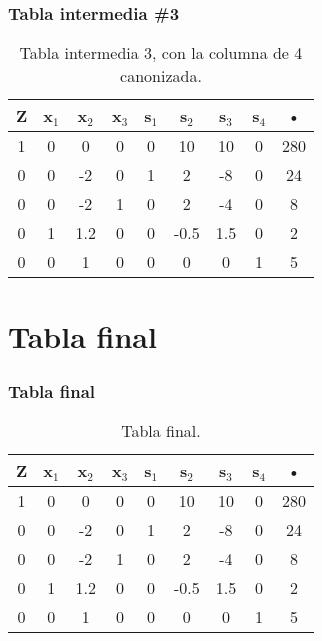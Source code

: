 \documentclass{beamer}
\begin{document}
 
\begin{frame}  
\frametitle{Tabla intermedia \#3} 
\begin{table}[H] 
\begin{center} 
\begin{tabular}{|*{9}{c|}} 
\hline 
\textbf{Z}  & \textbf{x$_{1}$} & \textbf{x$_{2}$} & \cellcolor{color_columna_candidata}\textcolor{color_blanco}{\textbf{x$_{3}$}} & \textbf{s$_{1}$} & \textbf{s$_{2}$} & \textbf{s$_{3}$} & \textbf{s$_{4}$} & \textbf{•} \\\hline \hline 
1 & 0 & 0 & \cellcolor{color_columna_candidata}\textcolor{color_blanco}{0} & 0 & 10 & 10 & 0 & 280 \\\hline 
0 & 0 & -2 & \cellcolor{color_columna_candidata}\textcolor{color_blanco}{0} & 1 & 2 & -8 & 0 & 24\\ 
\hline 
0 & 0 & -2 & \cellcolor{color_columna_candidata}\textcolor{color_blanco}{1} & 0 & 2 & -4 & 0 & 8\\ 
\hline 
0 & 1 & 1.2 & \cellcolor{color_columna_candidata}\textcolor{color_blanco}{0} & 0 & -0.5 & 1.5 & 0 & 2\\ 
\hline 
0 & 0 & 1 & \cellcolor{color_columna_candidata}\textcolor{color_blanco}{0} & 0 & 0 & 0 & 1 & 5\\ 
\hline 
\end{tabular} 
\caption{Tabla intermedia 3, con la columna de 4 canonizada.} 
\end{center} 
\end{table} 
\end{frame} 
 
\section{Tabla final} 
 
\begin{frame}  
\frametitle{Tabla final} 
\begin{table}[H] 
\begin{center} 
\begin{tabular}{|*{9}{c|}} 
\hline 
\textbf{Z}  & \textbf{x$_{1}$} & \textbf{x$_{2}$} & \textbf{x$_{3}$} & \textbf{s$_{1}$} & \textbf{s$_{2}$} & \textbf{s$_{3}$} & \textbf{s$_{4}$} & \textbf{•} \\\hline \hline 
1 & 0 & 0 & 0 & 0 & 10 & 10 & 0 & 280 \\\hline 
0 & 0 & -2 & 0 & 1 & 2 & -8 & 0 & 24\\ 
\hline 
0 & 0 & -2 & 1 & 0 & 2 & -4 & 0 & 8\\ 
\hline 
0 & 1 & 1.2 & 0 & 0 & -0.5 & 1.5 & 0 & 2\\ 
\hline 
0 & 0 & 1 & 0 & 0 & 0 & 0 & 1 & 5\\ 
\hline 
\end{tabular} 
\caption{Tabla final.} 
\end{center} 
\end{table} 
\end{frame} 
 
\end{document}
